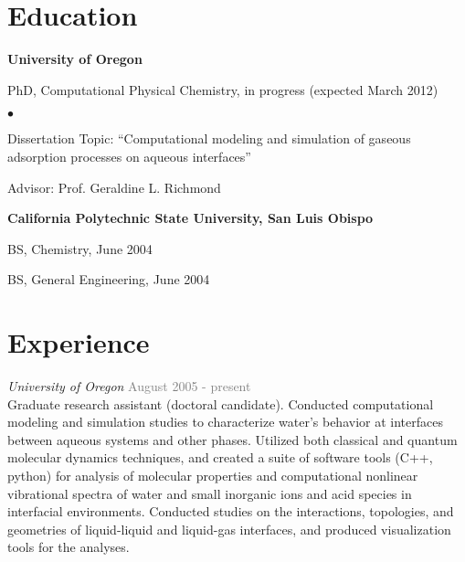 \documentclass[margin,line]{res}
\newenvironment{list1}{
  \begin{list}{\ding{113}}{%
      \setlength{\itemsep}{0in}
      \setlength{\parsep}{0in} \setlength{\parskip}{0in}
      \setlength{\topsep}{0in} \setlength{\partopsep}{0in} 
      \setlength{\leftmargin}{0.15in}}}{\end{list}}
\newenvironment{list2}{
  \begin{list}{$\bullet$}{%
      \setlength{\itemsep}{0in}
      \setlength{\parsep}{0in} \setlength{\parskip}{0in}
      \setlength{\topsep}{0in} \setlength{\partopsep}{0in} 
      \setlength{\leftmargin}{0.2in}}}{\end{list}}
\begin{document}
\begin{resume}

\section{\sc Education}
{\bf University of Oregon}\\
\vspace*{-.1in}
\begin{list1}
\item[] {\sc PhD}, Computational Physical Chemistry, in progress (expected March 2012) 
\begin{list2}
\item[] Dissertation Topic:  ``Computational modeling and simulation of gaseous adsorption processes on aqueous interfaces''
\item[] Advisor: Prof. Geraldine L. Richmond
\end{list2}
\end{list1}

{\bf California Polytechnic State University, San Luis Obispo}\\
\vspace*{-.1in}
\begin{list1}
\item[] {\sc BS}, Chemistry, June 2004
\item[] {\sc BS}, General Engineering, June 2004
\end{list1}

\section{\sc Experience}

\emph{University of Oregon} \hfill { \textcolor{gray}{August 2005 - present} }\\
\nopagebreak
Graduate research assistant (doctoral candidate).  Conducted computational modeling and simulation studies to characterize water's behavior at interfaces between aqueous systems and other phases. Utilized both classical and quantum molecular dynamics techniques, and created a suite of software tools (C++, python) for analysis of molecular properties and computational nonlinear vibrational spectra of water and small inorganic ions and acid species in interfacial environments. Conducted studies on the interactions, topologies, and geometries of liquid-liquid and liquid-gas interfaces, and produced visualization tools for the analyses.


\end{resume}
\end{document}
